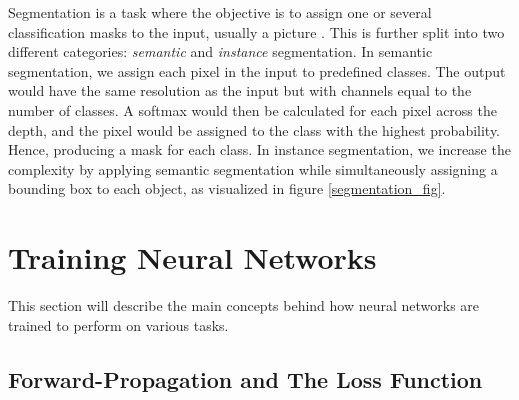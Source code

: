     Segmentation is a task where the objective is to assign one or several classification masks to the input, usually a picture \cite{He_2017_ICCV_segmentation}. This is further split into two different categories: \textit{semantic} and \textit{instance} segmentation. In semantic segmentation, we assign each pixel in the input to predefined classes. The output would have the same resolution as  the input but with channels equal to the number of classes. A softmax would then be calculated for each pixel across the depth, and the pixel would be assigned to the class with the highest probability. Hence, producing a mask for each class. In instance segmentation, we increase the complexity by applying semantic segmentation while simultaneously assigning a bounding box to each object, as visualized in figure \ref{segmentation_fig}.
    
\section{Training Neural Networks} \label{training neural networks}
    This section will describe the main concepts behind how neural networks are trained to perform on various tasks. 

\subsection{Forward-Propagation and The Loss Function}

